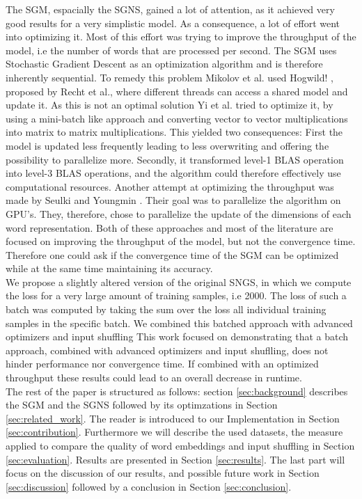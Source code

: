The SGM, espacially the SGNS, gained a lot of attention, as it achieved very good results for a very simplistic model. As a consequence, a lot of effort went into optimizing it. Most of this effort was trying to improve the throughput of the model, i.e the number of words that are processed per second. The SGM uses Stochastic Gradient Descent as an optimization algorithm and is therefore inherently sequential. To remedy this problem Mikolov et al. used Hogwild! \citep{hogwild}, proposed by Recht et al., where different threads can access a shared model and update it. As this is not an optimal solution Yi et al. \citep{intel} tried to optimize it, by using a mini-batch like approach and converting vector to vector multiplications into matrix to matrix multiplications. This yielded two consequences: First the model is updated less frequently leading to less overwriting and offering the possibility to parallelize more. Secondly, it transformed level-1 BLAS operation into level-3 BLAS operations, and the algorithm could therefore effectively use computational resources. Another attempt at optimizing the throughput was made by Seulki and Youngmin \citep{gpu}. Their goal was to parallelize the algorithm on GPU's. They, therefore, chose to parallelize the update of the dimensions of each word representation. Both of these approaches and most of the literature are focused on improving the throughput of the model, but not the convergence time.  Therefore one could ask if the convergence time of the SGM can be optimized while at the same time maintaining its accuracy.\\
We propose a slightly altered version of the original SNGS, in which we compute the loss for a very large amount of training samples, i.e 2000. The loss of such a batch was computed by taking the sum over the loss all individual training samples in the specific batch. We combined this batched approach with advanced optimizers and input shuffling  This work focused on demonstrating that a batch approach, combined with advanced optimizers and input shuflling, does not hinder performance nor convergence time. If combined with an optimized throughput these results could lead to an overall decrease in runtime.\\
 The rest of the paper is structured as follows: section \ref{sec:background}  describes the SGM and the SGNS followed by its optimzations in Section \ref{sec:related_work}.  The reader is introduced to our Implementation in Section \ref{sec:contribution}. Furthermore  we will describe the used datasets, the measure applied to compare the quality of word embeddings and input shuffling in Section \ref{sec:evaluation}. Results are presented in  Section \ref{sec:results}. The last part will focus on the discussion of our results, and possible future work in Section \ref{sec:discussion} followed by a conclusion in Section \ref{sec:conclusion}.